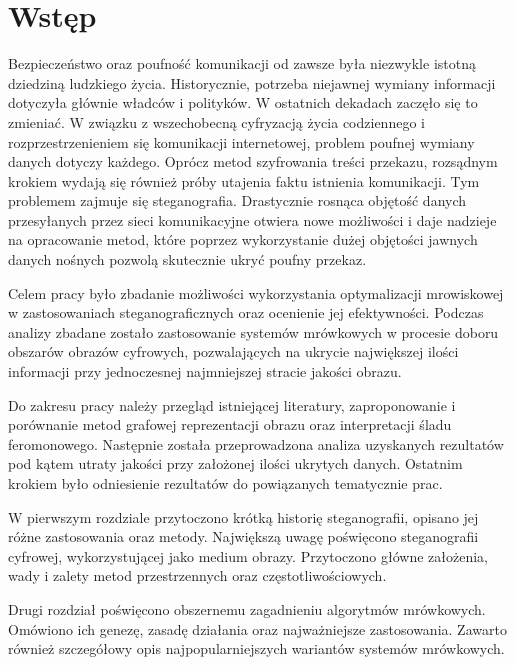 
\chapter*{Wstęp}\label{chap:intro}
{
    Bezpieczeństwo oraz poufność komunikacji od zawsze była niezwykle istotną dziedziną ludzkiego życia. Historycznie,
    potrzeba niejawnej wymiany informacji dotyczyła głównie władców i polityków. W ostatnich dekadach zaczęło się to
    zmieniać. W związku z wszechobecną cyfryzacją życia codziennego i rozprzestrzenieniem się komunikacji internetowej,
    problem poufnej wymiany danych dotyczy każdego. Oprócz metod szyfrowania treści przekazu, rozsądnym krokiem wydają
    się również próby utajenia faktu istnienia komunikacji. Tym problemem zajmuje się steganografia. Drastycznie rosnąca
    objętość danych przesyłanych przez sieci komunikacyjne otwiera nowe możliwości i daje nadzieje na opracowanie metod,
    które poprzez wykorzystanie dużej objętości jawnych danych nośnych pozwolą skutecznie ukryć poufny przekaz.

    Celem pracy było zbadanie możliwości wykorzystania optymalizacji mrowiskowej w zastosowaniach steganograficznych
    oraz ocenienie jej efektywności. Podczas analizy zbadane zostało zastosowanie systemów mrówkowych w procesie doboru
    obszarów obrazów cyfrowych, pozwalających na ukrycie największej ilości informacji przy jednoczesnej najmniejszej
    stracie jakości obrazu.

    Do zakresu pracy należy przegląd istniejącej literatury, zaproponowanie i porównanie metod grafowej reprezentacji
    obrazu oraz interpretacji śladu feromonowego. Następnie została przeprowadzona analiza uzyskanych rezultatów pod
    kątem utraty jakości przy założonej ilości ukrytych danych. Ostatnim krokiem było odniesienie rezultatów do
    powiązanych tematycznie prac.

    W pierwszym rozdziale przytoczono krótką historię steganografii, opisano jej różne zastosowania oraz metody.
    Największą uwagę poświęcono steganografii cyfrowej, wykorzystującej jako medium obrazy. Przytoczono główne
    założenia, wady i zalety metod przestrzennych oraz częstotliwościowych.

    Drugi rozdział poświęcono obszernemu zagadnieniu algorytmów mrówkowych. Omówiono ich genezę, zasadę działania oraz
    najważniejsze zastosowania. Zawarto również szczegółowy opis najpopularniejszych wariantów systemów mrówkowych.

}
